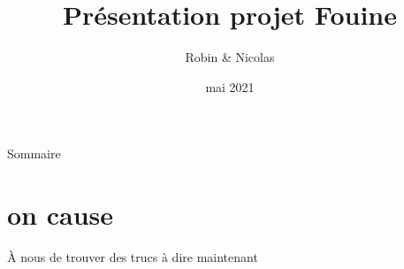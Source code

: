 \documentclass{beamer}
\title{Présentation projet Fouine}
\author{Robin \bsc{Jourde} \& Nicolas \bsc{Nardino}}
\date{mai 2021}
\begin{document}
\begin{frame}
  \titlepage
\end{frame}


\begin{frame}
  \begin{center}
    \tiny
    
  \end{center}
\end{frame}


\begin{frame}{Sommaire}
  \tableofcontents
\end{frame}


\section{on cause}
\begin{frame}{À nous de trouver des trucs à dire maintenant}


\end{frame}
\end{document}
